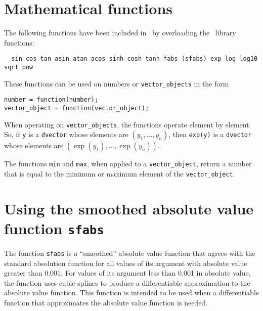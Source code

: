 \documentclass{admbmanual}
\begin{document}
\section{Mathematical functions}

The following functions have been included in \scAD\ by overloading the \cplus\
library functions:
\begin{lstlisting}
  sin cos tan asin atan acos sinh cosh tanh fabs (sfabs) exp log log10 sqrt pow
\end{lstlisting}
These functions can be used on numbers or \texttt{vector\_objects} in the form
\begin{lstlisting}
number = function(number);
vector_object = function(vector_object);
\end{lstlisting}
When operating on \texttt{vector\_objects}, the functions operate element by
element. So, if \texttt{y} is a \texttt{dvector} whose elements are
$(y_1,\ldots,y_n)$, then \texttt{exp(y)} is a \texttt{dvector} whose elements
are $(\exp(y_1),\ldots,\exp(y_n))$.

The functions \texttt{min} and \texttt{max}, when applied to a
\texttt{vector\_object}, return a number that is equal to the minimum or maximum
element of the \texttt{vector\_object}.

\section{Using the smoothed absolute value function \texttt{sfabs}}

The function \texttt{sfabs} is a ``smoothed'' absolute value function that
agrees with the standard absolution function for all values of its argument with
absolute value greater than 0.001. For values of its argument less than 0.001 in
absolute value, the function uses cubic splines to produce a differentiable
approximation to the absolute value function. This function is intended to be
used when a differentiable function that approximates the absolute value
function is needed.
\end{document}

